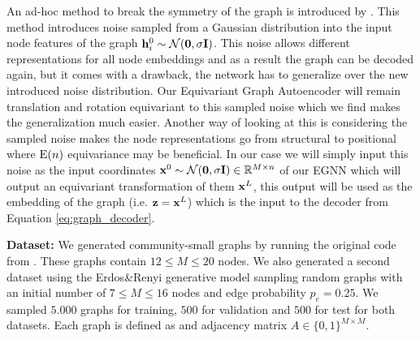 An ad-hoc method to break the symmetry of the graph is introduced by \cite{liu2019graph}. This method introduces noise sampled from a Gaussian distribution into the input node features of the graph $\mathbf{h}_i^{0} \sim \mathcal{N}(\mathbf{0}, \sigma\mathbf{I})$. This noise allows different representations for all node embeddings and as a result the graph can be decoded again, but it comes with a drawback, the network has to generalize over the new introduced noise distribution. Our Equivariant Graph Autoencoder will remain translation and rotation equivariant to this sampled noise which we find makes the generalization much easier. Another way of looking at this is considering the sampled noise makes the node representations go from structural to positional  \cite{srinivasan2019equivalence} where $\mathrm{E}(n)$ equivariance may be beneficial. In our case we will simply input this noise as the input coordinates $\mathbf{x}^{0} \sim \mathcal{N}(\mathbf{0}, \sigma\mathbf{I}) \in \mathbb{R}^{M \times n}$ of our EGNN which will output an equivariant transformation of them $\mathbf{x}^L$, this output will be used as the embedding of the graph (i.e. $\mathbf{z} = \mathbf{x}^L$) which is the input to the decoder from Equation \ref{eq:graph_decoder}.




\textbf{Dataset:} We generated community-small graphs \cite{you2018graphrnn, liu2019graph} by running the original code from \cite{you2018graphrnn}. These graphs contain $12\leq M \leq20$ nodes. We also generated a second dataset using the Erdos\&Renyi generative model \cite{bollobas2001random} sampling random graphs with an initial number of $7\leq M \leq16$ nodes and edge probability $p_e=0.25$. We sampled $5.000$ graphs for training, $500$ for validation and $500$ for test for both datasets. Each graph is defined as and adjacency matrix $A \in \{0, 1\}^{M \times M}$.

